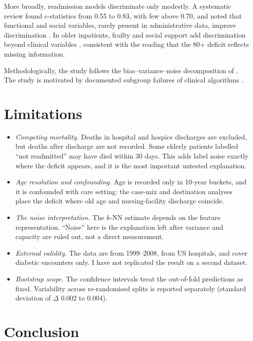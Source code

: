 \documentclass{article}
\begin{document}
More broadly, readmission models discriminate only modestly. A systematic review found c-statistics from 0.55 to 0.83, with few above 0.70, and noted that functional and social variables, rarely present in administrative data, improve discrimination \citep{kansagara2011}. In older inpatients, frailty and social support add discrimination beyond clinical variables \citep{sokoreli2019,kahlon2015}, consistent with the reading that the 80+ deficit reflects missing information.

Methodologically, the study follows the bias--variance--noise decomposition of \citet{chen2018}. The study is motivated by documented subgroup failures of clinical algorithms \citep{obermeyer2019,seyyed2021}.

\section{Limitations}

\begin{itemize}
  \item \emph{Competing mortality.} Deaths in hospital and hospice discharges are excluded, but deaths after discharge are not recorded. Some elderly patients labelled ``not readmitted'' may have died within 30 days. This adds label noise exactly where the deficit appears, and it is the most important untested explanation.
  \item \emph{Age resolution and confounding.} Age is recorded only in 10-year buckets, and it is confounded with care setting: the case-mix and destination analyses place the deficit where old age and nursing-facility discharge coincide.
  \item \emph{The noise interpretation.} The $k$-NN estimate depends on the feature representation. ``Noise'' here is the explanation left after variance and capacity are ruled out, not a direct measurement.
  \item \emph{External validity.} The data are from 1999--2008, from US hospitals, and cover diabetic encounters only. I have not replicated the result on a second dataset.
  \item \emph{Bootstrap scope.} The confidence intervals treat the out-of-fold predictions as fixed. Variability across re-randomised splits is reported separately (standard deviation of $\Delta$ 0.002 to 0.004).
\end{itemize}

\section{Conclusion}
\end{document}
